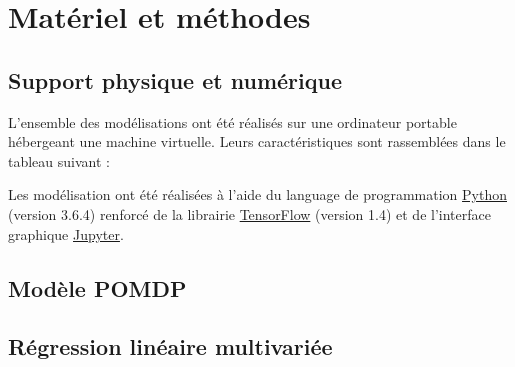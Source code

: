 
\chapter{Matériel et méthodes} %
\label{Materiel_methode} %


\section{Support physique et numérique} %
L'ensemble des modélisations ont été réalisés sur une ordinateur portable hébergeant une machine virtuelle. Leurs caractéristiques sont rassemblées dans le tableau suivant :\\


Les modélisation ont été réalisées à l'aide du language de programmation \href{https://www.python.org/}{Python} (version 3.6.4) renforcé de la librairie \href{https://www.tensorflow.org/}{TensorFlow} (version 1.4) et de l'interface graphique \href{https://jupyter.org/}{Jupyter}.


\section{Modèle POMDP} %


\section{Régression linéaire multivariée} %